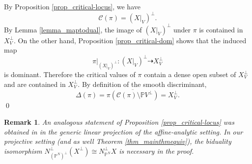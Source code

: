 \documentclass[12pt]{amsart}
\newtheorem{theorem}{Theorem}[section]
\newtheorem{remark}[theorem]{Remark}
\begin{document}
By Proposition \ref{prop_critical-locus}, we have
\[
\mathcal C(\pi)=(X|_V)^\perp.
\]
By Lemma \ref{lemma_maptodual}, the image of
$(X|_V)^\perp$ under $\pi$ is contained in $X_V^\perp$.
On the other hand, Proposition \ref{prop_critical-dom} shows that the induced map
\[
\pi|_{(X|_V)^\perp}:(X|_V)^\perp \dashrightarrow X_V^\perp
\]
is dominant. Therefore the critical values of $\pi$ contain a dense open subset of
$X_V^\perp$ and are contained in $X_V^\perp$. By definition of the smooth
discriminant,
\begin{equation*}
\Delta(\pi)=\overline{\pi(\mathcal C(\pi)\setminus \mathbb PV^\perp)}=X_V^\perp.
\end{equation*}
\qed

\begin{remark}\normalfont
An analogous statement of Proposition \ref{prop_critical-locus} was obtained in \cite[Proposition 3.9]{FT18} in the generic linear projection of the affine-analytic setting. In our projective setting (and as well Theorem \ref{thm_mainthmequiv}), the biduality isomorphism $N_{(\mathbb P^N)^{\perp}}^{\perp}(X^{\perp})\cong N_{\mathbb P^N}^{\perp}X$ is necessary in the proof. 
\end{remark}
\end{document}
